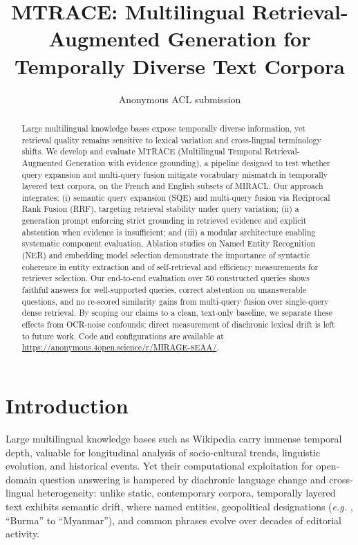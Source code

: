 \documentclass[11pt]{article}
\title{MTRACE: Multilingual Retrieval-Augmented Generation for Temporally Diverse Text Corpora}
\author{Anonymous ACL submission}
\newcommand{\eg}{\textit{e.g. }}
\begin{document}
\maketitle
\begin{abstract}
Large multilingual knowledge bases expose temporally diverse information, yet retrieval quality remains sensitive to lexical variation and cross-lingual terminology shifts. We develop and evaluate MTRACE (Multilingual Temporal Retrieval-Augmented Generation with evidence grounding), a pipeline designed to test whether query expansion and multi-query fusion mitigate vocabulary mismatch in temporally layered text corpora, on the French and English subsets of MIRACL. Our approach integrates: (i) semantic query expansion (SQE) and multi-query fusion via Reciprocal Rank Fusion (RRF), targeting retrieval stability under query variation; (ii) a generation prompt enforcing strict grounding in retrieved evidence and explicit abstention when evidence is insufficient; and (iii) a modular architecture enabling systematic component evaluation. Ablation studies on Named Entity Recognition (NER) and embedding model selection demonstrate the importance of syntactic coherence in entity extraction and of self-retrieval and efficiency measurements for retriever selection. Our end-to-end evaluation over 50 constructed queries shows faithful answers for well-supported queries, correct abstention on unanswerable questions, and no re-scored similarity gains from multi-query fusion over single-query dense retrieval. By scoping our claims to a clean, text-only baseline, we separate these effects from OCR-noise confounds; direct measurement of diachronic lexical drift is left to future work. Code and configurations are available at \url{https://anonymous.4open.science/r/MIRAGE-8EAA/}.
\end{abstract}

\section{Introduction}
\label{sec:intro}

Large multilingual knowledge bases such as Wikipedia carry immense temporal depth, valuable for longitudinal analysis of socio-cultural trends, linguistic evolution, and historical events. Yet their computational exploitation for open-domain question answering is hampered by diachronic language change and cross-lingual heterogeneity: unlike static, contemporary corpora, temporally layered text exhibits semantic drift, where named entities, geopolitical designations (\eg, ``Burma'' to ``Myanmar''), and common phrases evolve over decades of editorial activity.
\end{document}
